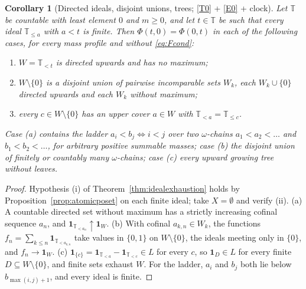 \documentclass[11pt,a4paper]{article}
\theoremstyle{plain}
\newtheorem{corollary}[theorem]{Corollary}
\theoremstyle{definition}
\theoremstyle{remark}
\newcommand{\T}{\mathbb{T}}                     %
\newcommand{\one}{\mathbf{1}}
\begin{document}
\begin{corollary}[Directed ideals, disjoint unions, trees; \eqref{T0} + \eqref{E0} + clock]
  \label{cor:idealexhaustion}
  Let $\T$ be countable with least element $0$ and $m \geq 0$, and let
  $t \in \T$ be such that every ideal $\T_{\leq a}$ with $a < t$ is finite.
  Then $\Phi(t,0) = \Phi(0,t)$ in each of the following cases, for every mass
  profile and without \eqref{eq:Fcond}:
  \begin{enumerate}[label=(\alph*)]
  \item $W = \T_{<t}$ is directed upwards and has no maximum;
  \item $W \setminus \{0\}$ is a disjoint union of pairwise incomparable sets
    $W_k$, each $W_k \cup \{0\}$ directed upwards and each $W_k$ without
    maximum;
  \item every $c \in W \setminus \{0\}$ has an upper cover $a \in W$ with
    $\T_{<a} = \T_{\leq c}$.
  \end{enumerate}
  Case (a) contains the ladder $a_i < b_j \iff i < j$ over two $\omega$-chains
  $a_1 < a_2 < \dots$ and $b_1 < b_2 < \dots$, for arbitrary positive summable
  masses; case (b) the disjoint union of finitely or countably many
  $\omega$-chains; case (c) every upward growing tree without leaves.
\end{corollary}

\begin{proof}
  Hypothesis (i) of Theorem~\ref{thm:idealexhaustion} holds by
  Proposition~\ref{prop:atomicposet} on each finite ideal; take $X = \emptyset$
  and verify (ii).  (a) A countable directed set without maximum has a strictly
  increasing cofinal sequence $a_n$, and $\one_{\T_{<a_n}} \uparrow \one_W$.
  (b) With cofinal $a_{k,n} \in W_k$, the functions
  $f_n = \sum_{k \leq n} \one_{\T_{<a_{k,n}}}$ take values in $\{0,1\}$ on
  $W \setminus \{0\}$, the ideals meeting only in $\{0\}$, and $f_n \to \one_W$.
  (c) $\one_{\{c\}} = \one_{\T_{<a}} - \one_{\T_{<c}} \in L$ for every $c$, so
  $\one_D \in L$ for every finite $D \subseteq W \setminus \{0\}$, and finite
  sets exhaust $W$.  For the ladder, $a_i$ and $b_j$ both lie below
  $b_{\max(i,j)+1}$, and every ideal is finite.
\end{proof}
\end{document}
